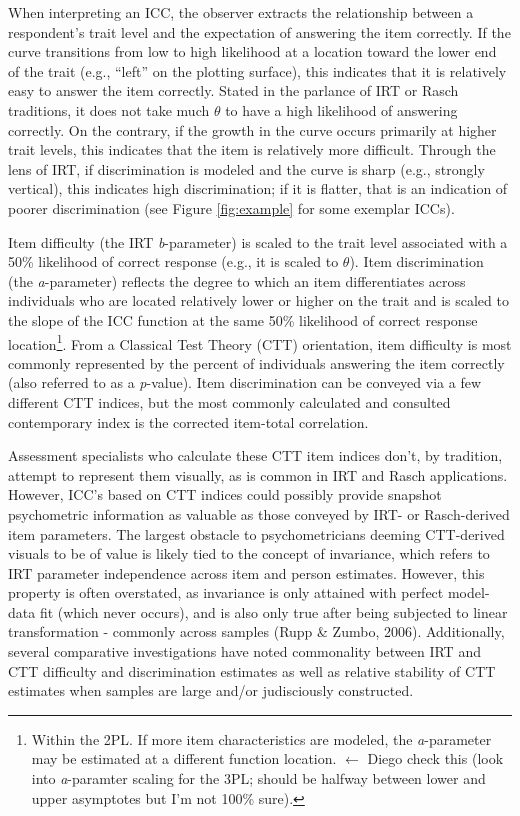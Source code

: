 \documentclass[
  jou]{apa6}
\begin{document}
When interpreting an ICC, the observer extracts the relationship between a respondent's trait level and the expectation of answering the item correctly. If the curve transitions from low to high likelihood at a location toward the lower end of the trait (e.g., ``left'' on the plotting surface), this indicates that it is relatively easy to answer the item correctly. Stated in the parlance of IRT or Rasch traditions, it does not take much \(\theta\) to have a high likelihood of answering correctly. On the contrary, if the growth in the curve occurs primarily at higher trait levels, this indicates that the item is relatively more difficult. Through the lens of IRT, if discrimination is modeled and the curve is sharp (e.g., strongly vertical), this indicates high discrimination; if it is flatter, that is an indication of poorer discrimination (see Figure \ref{fig:example} for some exemplar ICCs).

Item difficulty (the IRT \emph{b}-parameter) is scaled to the trait level associated with a 50\% likelihood of correct response (e.g., it is scaled to \(\theta\)). Item discrimination (the \emph{a}-parameter) reflects the degree to which an item differentiates across individuals who are located relatively lower or higher on the trait and is scaled to the slope of the ICC function at the same 50\% likelihood of correct response location\footnote{Within the 2PL. If more item characteristics are modeled, the \emph{a}-parameter may be estimated at a different function location. \(\leftarrow\) Diego check this (look into \emph{a}-paramter scaling for the 3PL; should be halfway between lower and upper asymptotes but I'm not 100\% sure).}. From a Classical Test Theory (CTT) orientation, item difficulty is most commonly represented by the percent of individuals answering the item correctly (also referred to as a \emph{p}-value). Item discrimination can be conveyed via a few different CTT indices, but the most commonly calculated and consulted contemporary index is the corrected item-total correlation.

Assessment specialists who calculate these CTT item indices don't, by tradition, attempt to represent them visually, as is common in IRT and Rasch applications. However, ICC's based on CTT indices could possibly provide snapshot psychometric information as valuable as those conveyed by IRT- or Rasch-derived item parameters. The largest obstacle to psychometricians deeming CTT-derived visuals to be of value is likely tied to the concept of invariance, which refers to IRT parameter independence across item and person estimates. However, this property is often overstated, as invariance is only attained with perfect model-data fit (which never occurs), and is also only true after being subjected to linear transformation - commonly across samples (Rupp \& Zumbo, 2006). Additionally, several comparative investigations have noted commonality between IRT and CTT difficulty and discrimination estimates as well as relative stability of CTT estimates when samples are large and/or judisciously constructed.
\end{document}
